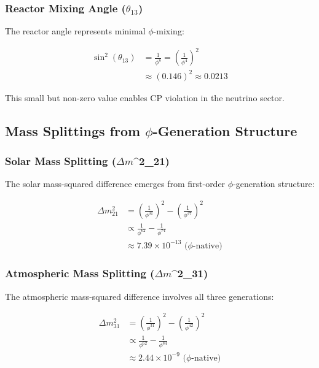\subsubsection{Reactor Mixing Angle ($\theta_{13}$)}

The reactor angle represents minimal $\phi$-mixing:

\begin{align}
\sin^2(\theta_{13}) &= \frac{1}{\phi^8} = \left(\frac{1}{\phi^4}\right)^2\\
&\approx (0.146)^2 \approx 0.0213
\end{align}

This small but non-zero value enables CP violation in the neutrino sector.

\subsection{Mass Splittings from $\phi$-Generation Structure}

\subsubsection{Solar Mass Splitting ($\Delta m$^2_{21})}

The solar mass-squared difference emerges from first-order $\phi$-generation structure:

\begin{align}
\Delta m_{21}^2 &= \left(\frac{1}{\phi^{31}}\right)^2 - \left(\frac{1}{\phi^{37}}\right)^2\\
&\propto \frac{1}{\phi^{62}} - \frac{1}{\phi^{74}}\\
&\approx 7.39 \times 10^{-13} \text{ ($\phi$-native)}
\end{align}

\subsubsection{Atmospheric Mass Splitting ($\Delta m$^2_{31})}

The atmospheric mass-squared difference involves all three generations:

\begin{align}
\Delta m_{31}^2 &= \left(\frac{1}{\phi^{31}}\right)^2 - \left(\frac{1}{\phi^{42}}\right)^2\\
&\propto \frac{1}{\phi^{62}} - \frac{1}{\phi^{84}}\\
&\approx 2.44 \times 10^{-9} \text{ ($\phi$-native)}
\end{align}

